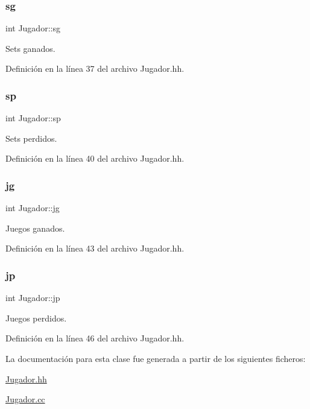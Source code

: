 \subsubsection{\texorpdfstring{sg}{sg}}
{\footnotesize\ttfamily int Jugador\+::sg\hspace{0.3cm}{\ttfamily [private]}}



Sets ganados. 



Definición en la línea 37 del archivo Jugador.\+hh.

\mbox{\label{class_jugador_a5bed10a21acb0c437828df282050b2ab}} 
\subsubsection{\texorpdfstring{sp}{sp}}
{\footnotesize\ttfamily int Jugador\+::sp\hspace{0.3cm}{\ttfamily [private]}}



Sets perdidos. 



Definición en la línea 40 del archivo Jugador.\+hh.

\mbox{\label{class_jugador_a53ac73c3dc720ca6e66406b309077472}} 
\subsubsection{\texorpdfstring{jg}{jg}}
{\footnotesize\ttfamily int Jugador\+::jg\hspace{0.3cm}{\ttfamily [private]}}



Juegos ganados. 



Definición en la línea 43 del archivo Jugador.\+hh.

\mbox{\label{class_jugador_a306eb04292a1aa300a39c2464c1368fd}} 
\subsubsection{\texorpdfstring{jp}{jp}}
{\footnotesize\ttfamily int Jugador\+::jp\hspace{0.3cm}{\ttfamily [private]}}



Juegos perdidos. 



Definición en la línea 46 del archivo Jugador.\+hh.



La documentación para esta clase fue generada a partir de los siguientes ficheros\+:\begin{DoxyCompactItemize}
\item 
\hyperlink{_jugador_8hh}{Jugador.\+hh}\item 
\hyperlink{_jugador_8cc}{Jugador.\+cc}\end{DoxyCompactItemize}
